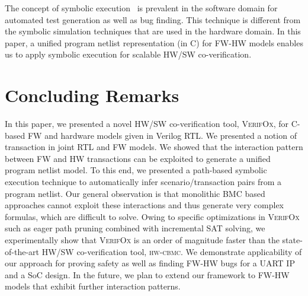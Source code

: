\documentclass[sigconf]{acmart}
\newcommand{\tool}[1]{\textsc{#1}\xspace}
\newcommand{\hwcbmcv}{\tool{hw-cbmc}}
\newcommand{\verifox}{\tool{VerifOx}}
\begin{document}
The concept of symbolic execution~\cite{DBLP:journals/tse/Clarke76,
DBLP:conf/pldi/GodefroidKS05, DBLP:conf/osdi/CadarDE08} is prevalent in the
software domain for automated test generation as well as bug finding.  This
technique is different from the symbolic simulation techniques that are used
in the hardware domain.  In this paper, a unified program netlist
representation (in C) for FW-HW models enables us to apply symbolic
execution for scalable HW/SW co-verification.

\section{Concluding Remarks}

In this paper, we presented a novel HW/SW co-verification tool, \verifox,
for C-based FW and hardware models given in Verilog RTL.  We presented a
notion of transaction in joint RTL and FW models.  We showed that the
interaction pattern between FW and HW transactions can be exploited to
generate a unified program netlist model.  To this end, we presented a
path-based symbolic execution technique to automatically infer
scenario/transaction pairs from a program netlist.  Our general observation
is that monolithic BMC based approaches cannot exploit these interactions
and thus generate very complex formulas, which are difficult to solve. 
Owing to specific optimizations in \verifox such as eager path pruning
combined with incremental SAT solving, we experimentally show that \verifox
is an order of magnitude faster than the state-of-the-art HW/SW
co-verification tool, \hwcbmcv.  We demonstrate applicability of our
approach for proving safety as well as finding FW-HW bugs for a UART IP and
a SoC design.  In the future, we plan to extend our framework to FW-HW
models that exhibit further interaction patterns.


 
\end{document}

